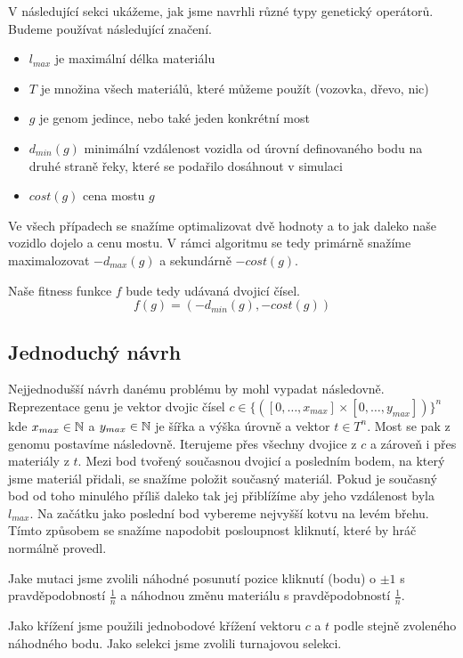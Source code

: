 V následující sekci ukážeme, jak jsme navrhli různé typy genetický operátorů. Budeme používat následující značení.
\begin{itemize}
    \item $l_{max}$ je maximální délka materiálu
    \item $T$ je množina všech materiálů, které můžeme použít (vozovka, dřevo, nic)
    \item $g$ je genom jedince, nebo také jeden konkrétní most
    \item $d_{min}(g)$ minimální vzdálenost vozidla od úrovní definovaného bodu na druhé straně řeky, které se podařilo dosáhnout v simulaci
    \item $cost(g)$ cena mostu $g$
\end{itemize}

Ve všech případech se snažíme optimalizovat dvě hodnoty a to jak daleko naše vozidlo dojelo a cenu mostu. V rámci algoritmu se tedy primárně snažíme maximalozovat $-d_{max}(g)$ a sekundárně $-cost(g)$.

Naše fitness funkce $f$ bude tedy udávaná dvojicí čísel. $$f(g) = (-d_{min}(g), -cost(g))$$

\subsection{Jednoduchý návrh}

Nejjednodušší návrh danému problému by mohl vypadat následovně. Reprezentace genu je vektor dvojic čísel $c \in \{([0, \dots, x_{max}] \times [0, \dots, y_{max}])\}^n$ kde $x_{max} \in \mathbb{N}$ a $y_{max} \in \mathbb{N}$ je šířka a výška úrovně a vektor $t \in T^n$. Most se pak z genomu postavíme následovně. Iterujeme přes všechny dvojice z $c$ a zároveň i přes materiály z $t$. Mezi bod tvořený současnou dvojicí a posledním bodem, na který jsme materiál přidali, se snažíme položit současný materiál. Pokud je současný bod od toho minulého příliš daleko tak jej přiblížíme aby jeho vzdálenost byla $l_{max}$. Na začátku jako poslední bod vybereme nejvyšší kotvu na levém břehu. Tímto způsobem se snažíme napodobit posloupnost kliknutí, které by hráč normálně provedl.

Jake mutaci jsme zvolili náhodné posunutí pozice kliknutí (bodu) o $\pm 1$ s pravděpodobností $\frac{1}{n}$ a náhodnou změnu materiálu s pravděpodobností $\frac{1}{n}$.

Jako křížení jsme použili jednobodové křížení vektoru $c$ a $t$ podle stejně zvoleného náhodného bodu. Jako selekci jsme zvolili turnajovou selekci.

